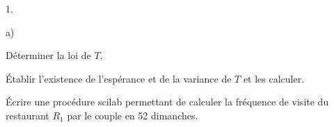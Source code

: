 \begin{exerciceAP}
\begin{noliste}{1.}
    \begin{noliste}{a)}
    \setlength{\itemsep}{2mm}
    \item Déterminer la loi de $T$.
    \item Établir l'existence de l'espérance et de la variance de $T$
      et les calculer.
    \end{noliste}

  \item Écrire une procédure scilab permettant de calculer la
    fréquence de visite du restaurant $R_1$ par le couple en 52
    dimanches.
  \end{noliste}
\end{exerciceAP} 



